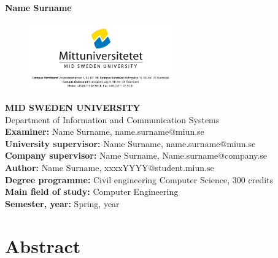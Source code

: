 \documentclass[12pt]{report}
\begin{document}
{\begin{titlepage}
\begin{tcolorbox}
\hspace*{6.4ex} \textbf{Name Surname}\\
\vspace{19ex}
\end{tcolorbox}
\begin{figure}[h]
    \centering
    \includegraphics[width=0.55\textwidth,trim=4 4 4 4,clip]{Illustrations/miunlogo.png}
    \label{fig:miunlogo}
\end{figure}
\end{titlepage}
\setcounter{page}{2}
\restoregeometry
{}
\vspace*{\fill}
\noindent\textbf{MID SWEDEN UNIVERSITY}\\
\footnotesize{
Department of Information and Communication Systems\\
\textbf{Examiner:} Name Surname, name.surname@miun.se\\
\textbf{University supervisor:} Name Surname, name.surname@miun.se\\
\textbf{Company supervisor:} Name Surname, Name.surname@company.se\\
\textbf{Author:} Name Surname, xxxxYYYY@student.miun.se\\
\textbf{Degree programme:} Civil engineering Computer Science, 300 credits\\
\textbf{Main field of study:} Computer Engineering\\
\textbf{Semester, year:} Spring, year  \\}
\vspace{10ex}
\newpage

}
\pagestyle{fancy}
\fancyhead{}
\fancyhead[R]{\today}
\fancyfoot[C]{\vspace*{-1.6\baselineskip}\thepage}

\chapter*{\hspace*{42pt}\Huge{Abstract}}
    
\newpage
\end{document}
